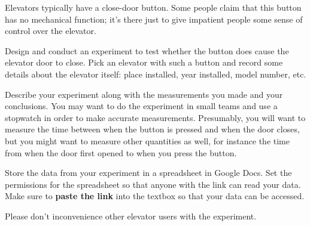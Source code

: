 

Elevators typically have a close-door button.  Some people claim that
this button has no mechanical function; it's there just to give
impatient people some sense of control over the elevator.  

Design and conduct an experiment to test whether the button does cause
the elevator door to close.  Pick an elevator with such a button and
record some details about the elevator itself: place installed, year
installed, model number, etc.  

Describe your experiment along with the measurements you made and your
conclusions.  You may want to do the experiment in small teams and use
a stopwatch in order to make accurate measurements.  Presumably, you
will want to measure the time between when the button is pressed and
when the door closes, but you might want to measure other quantities
as well, for instance the time from when the door first opened to when
you press the button.  

Store the data from your experiment in a spreadsheet in Google Docs.
Set the permissions for the spreadsheet so that anyone with the link
can read your data.  Make sure to {\bf paste the link} into the
textbox so that your data can be accessed.

Please don't inconvenience other elevator users with the experiment.

\TextEntry

